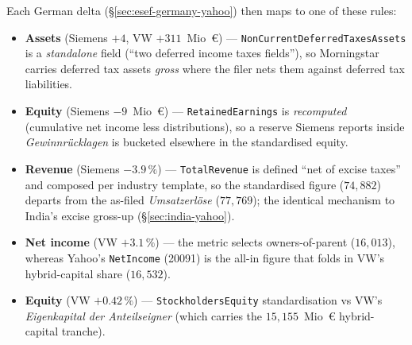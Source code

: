 \documentclass[11pt,a4paper]{report}
\begin{document}
\noindent Each German delta (\S\ref{sec:esef-germany-yahoo}) then maps to one of these rules:
\begin{itemize}
  \item \textbf{Assets} (Siemens $+4$, VW $+311$~Mio~€) --- \texttt{NonCurrentDeferredTaxesAssets} is a
    \emph{standalone} field (``two deferred income taxes fields''), so Morningstar carries deferred tax assets
    \emph{gross} where the filer nets them against deferred tax liabilities.
  \item \textbf{Equity} (Siemens $-9$~Mio~€) --- \texttt{RetainedEarnings} is \emph{recomputed} (cumulative net
    income less distributions), so a reserve Siemens reports inside \emph{Gewinnr\"ucklagen} is bucketed
    elsewhere in the standardised equity.
  \item \textbf{Revenue} (Siemens $-3.9\,\%$) --- \texttt{TotalRevenue} is defined ``net of excise taxes'' and
    composed per industry template, so the standardised figure ($74{,}882$) departs from the as-filed
    \emph{Umsatzerl\"ose} ($77{,}769$); the identical mechanism to India's excise gross-up (\S\ref{sec:india-yahoo}).
  \item \textbf{Net income} (VW $+3.1\,\%$) --- the metric selects owners-of-parent ($16{,}013$), whereas Yahoo's
    \texttt{NetIncome} (20091) is the all-in figure that folds in VW's hybrid-capital share ($16{,}532$).
  \item \textbf{Equity} (VW $+0.42\,\%$) --- \texttt{StockholdersEquity} standardisation vs VW's
    \emph{Eigenkapital der Anteilseigner} (which carries the $15{,}155$~Mio~€ hybrid-capital tranche).
\end{itemize}
\end{document}
